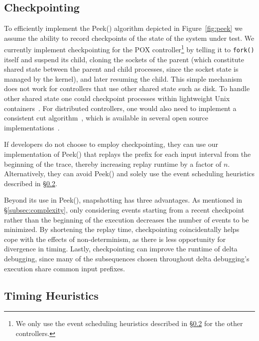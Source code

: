 \subsection{Checkpointing}
\label{subsec:snapshotting}

To efficiently implement the {\sc Peek()} algorithm depicted in
Figure~\ref{fig:peek} we assume the ability to record checkpoints of the state of the
system under test. We currently implement checkpointing for the POX
controller\footnote{We only use the event scheduling heuristics described in
\S\ref{subsec:timing_heuristics} for the other controllers.} by telling it to \verb=fork()= itself and suspend its child,
cloning the sockets of the parent
(which constitute shared state between the parent and child processes,
since the socket state is managed by the kernel),
and later resuming the child. This simple mechanism does
not work for controllers that use other shared state such as disk.
To handle other shared state one could checkpoint processes within
lightweight Unix containers~\cite{lxc}. For distributed controllers, one
would also need to implement a consistent cut
algorithm~\cite{Chandy:1985:DSD:214451.214456}, which is available in several open source
implementations~\cite{ansel2009dmtcp}.

If developers do not choose to employ checkpointing,
they can use our implementation of {\sc Peek()} that replays the prefix for each input
interval from the beginning of the trace, thereby increasing replay runtime by
a factor of $n$. Alternatively, they can
avoid {\sc Peek()} and solely use the event scheduling heuristics described in \S\ref{subsec:timing_heuristics}.

Beyond its use in {\sc Peek()}, snapshotting has three advantages.
As mentioned in \S\ref{subsec:complexity}, only considering events starting
from a recent checkpoint rather than the beginning of the execution decreases the number of events to
be minimized. By shortening the replay time, checkpointing coincidentally helps cope
with the effects of non-determinism, as there is less opportunity for
divergence in timing. Lastly, checkpointing can improve the runtime of delta
debugging, since many of the subsequences chosen throughout delta debugging's
execution share common input prefixes.

\subsection{Timing Heuristics}
\label{subsec:timing_heuristics}

